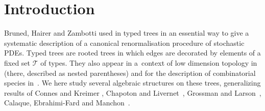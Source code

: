 \documentclass[pdftex]{sigma}
\numberwithin{equation}{section}
\newcommand{\T}{\mathcal{T}}
\begin{document}

\renewcommand{\thefootnote}{\arabic{footnote}}
\setcounter{footnote}{0}

\section{Introduction}

Bruned, Hairer and Zambotti used in \cite{Bruned,Hairer} typed trees in an essential way
to give a systematic description of a canonical renormalisation procedure of
stochastic PDEs. Typed trees are rooted trees in which edges are decorated by elements of a fixed set $\T$ of types.
They also appear in a~context of low dimension topology in \cite{Mathar} (there, described as nested parentheses)
and for the description
of combinatorial species in~\cite{Bergeron}.
We here study several algebraic structures on these trees, generalizing results of Connes and Kreimer \cite{ConnesKreimer},
Chapoton and Livernet~\cite{ChapotonLivernet}, Grossman and Larson~\cite{GrossmanLarson},
Calaque, Ebrahimi-Fard and Manchon~\cite{Manchon}.
\end{document}
